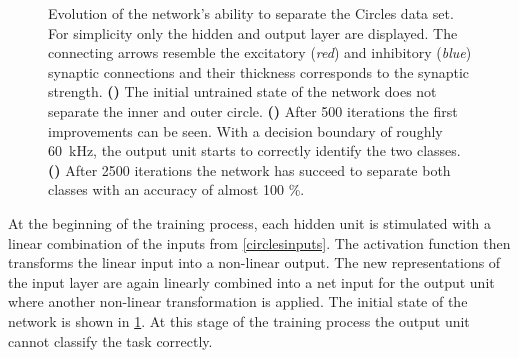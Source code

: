 \begin{figure}[t!]
	\begin{subfigure}{\textwidth}
		\caption{}
		\vspace{-0.1in}
		\centering
		
		\label{learning_process_s5}
		\vspace{-.5in}
	\end{subfigure}
	\begin{subfigure}{\textwidth}
		\caption{}
		\vspace{-0.1in}
		\centering
		
		\label{learning_process_s500}
		\vspace{-.5in}
	\end{subfigure}
	\begin{subfigure}{\textwidth}
		\caption{}
		\vspace{-0.1in}
		\centering
		
		\label{learning_process_s2500}
	\end{subfigure}
	\vspace{-.4in}
	\caption[Evolution of the network's ability to separate the Circles data set.]{Evolution of the network's ability to separate the Circles data set. For simplicity only the hidden and output layer are displayed. The connecting arrows resemble the excitatory (\emph{red}) and inhibitory (\emph{blue}) synaptic connections and their thickness corresponds to the synaptic strength. \textbf{()} The initial untrained state of the network does not separate the inner and outer circle. \textbf{()} After 500 iterations the first improvements can be seen. With a decision boundary of roughly \SI{60}{\kilo \Hz}, the output unit starts to correctly identify the two classes. \textbf{()} After 2500 iterations the network has succeed to separate both classes with an accuracy of almost 100 \%.}
\end{figure}

At the beginning of the training process, each hidden unit is stimulated with a linear combination of the inputs from \cref{circlesinputs}. The activation function then transforms the linear input into a non-linear output. The new representations of the input layer are again linearly combined into a net input for the output unit where another non-linear transformation is applied. The initial state of the network is shown in \cref{learning_process_s5}. At this stage of the training process the output unit cannot classify the task correctly.


